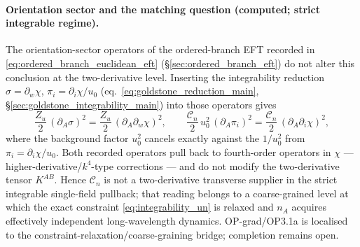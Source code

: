 

\paragraph{Orientation sector and the matching question (computed;
strict integrable regime).}
The orientation-sector operators of the ordered-branch EFT
recorded in \eqref{eq:ordered_branch_euclidean_eft}
(\S\ref{sec:ordered_branch_eft}) do not alter this conclusion at
the two-derivative level.
Inserting the integrability reduction $\sigma=\partial_w\chi$,
$\pi_i=\partial_i\chi/u_0$
(eq.~\eqref{eq:goldstone_reduction_main},
\S\ref{sec:goldstone_integrability_main}) into those operators
gives
\[
\frac{Z_u}{2}\,(\partial_A\sigma)^2
=\frac{Z_u}{2}\,(\partial_A\partial_w\chi)^2 ,
\qquad
\frac{\mathcal C_n}{2}\,u_0^2\,(\partial_A\pi_i)^2
=\frac{\mathcal C_n}{2}\,(\partial_A\partial_i\chi)^2 ,
\]
where the background factor $u_0^2$ cancels exactly against the
$1/u_0^2$ from $\pi_i=\partial_i\chi/u_0$.
Both recorded operators pull back to fourth-order operators in
$\chi$ --- higher-derivative/$k^4$-type corrections --- and do
not modify the two-derivative tensor $K^{AB}$.
Hence $\mathcal C_n$ is not a two-derivative transverse supplier
in the strict integrable single-field pullback; that reading
belongs to a coarse-grained level at which the exact constraint
\eqref{eq:integrability_un} is relaxed and $n_A$ acquires
effectively independent long-wavelength dynamics.
OP-grad/OP3.1a is localised to the
constraint-relaxation/coarse-graining bridge; completion remains
open.
